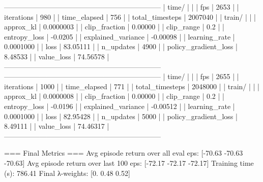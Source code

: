 ------------------------------------------------------------------
| time/                   |              |
|    fps                  |         2653 |
|    iterations           |          980 |
|    time_elapsed         |          756 |
|    total_timesteps      |      2007040 |
| train/                  |              |
|    approx_kl            |    0.0000003 |
|    clip_fraction        |      0.00000 |
|    clip_range           |          0.2 |
|    entropy_loss         |      -0.0205 |
|    explained_variance   |     -0.00098 |
|    learning_rate        |    0.0001000 |
|    loss                 |     83.05111 |
|    n_updates            |         4900 |
|    policy_gradient_loss |      8.48533 |
|    value_loss           |     74.56578 |
------------------------------------------------------------------
------------------------------------------------------------------
| time/                   |              |
|    fps                  |         2655 |
|    iterations           |         1000 |
|    time_elapsed         |          771 |
|    total_timesteps      |      2048000 |
| train/                  |              |
|    approx_kl            |    0.0000008 |
|    clip_fraction        |      0.00000 |
|    clip_range           |          0.2 |
|    entropy_loss         |      -0.0196 |
|    explained_variance   |     -0.00512 |
|    learning_rate        |    0.0001000 |
|    loss                 |     82.95428 |
|    n_updates            |         5000 |
|    policy_gradient_loss |      8.49111 |
|    value_loss           |     74.46317 |
------------------------------------------------------------------

=== Final Metrics ===
Avg episode return over all eval eps: [-70.63 -70.63 -70.63]
Avg episode return over last 100 eps: [-72.17 -72.17 -72.17]
Training time (s): 786.41
Final λ-weights: [0.   0.48 0.52]

